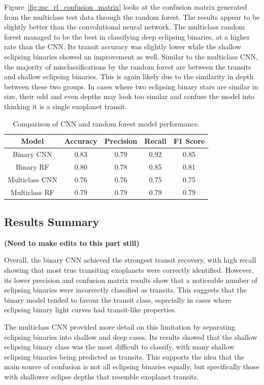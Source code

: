 Figure~\ref{fig:mc_rf_confusion_matrix} looks at the confusion matrix generated from the multiclass test data through the random forest. The results appear to be slightly better than the convolutional neural network. The multiclass random forest managed to be the best in classifying deep eclipsing binaries, at a higher rate than the CNN. Its transit accuracy was slightly lower while the shallow eclipsing binaries showed an improvement as well. Similar to the multiclass CNN, the majority of misclassifications by the random forest are between the transits and shallow eclipsing binaries. This is again likely due to the similarity in depth between these two groups. In cases where two eclipsing binary stars are similar in size, their odd and even depths may look too similar and confuse the model into thinking it is a single exoplanet transit.

\begin{table}[H]
    \centering
    \begin{tabular}{c|c|c|c|c}
        Model & Accuracy & Precision & Recall & F1 Score \\ \hline
        Binary CNN & 0.83 & 0.79 & 0.92 & 0.85 \\
        Binary RF & 0.80 & 0.78 & 0.85 & 0.81 \\
        Multiclass CNN & 0.76 & 0.76 & 0.75 & 0.75 \\
        Multiclass RF & 0.79 & 0.79 & 0.79 & 0.79
    \end{tabular}
    \caption{Comparison of CNN and random forest model performance.}
    \label{tab:model_comparison}
\end{table}

\subsection{Results Summary} \textbf{(Need to make edits to this part still)}

Overall, the binary CNN achieved the strongest transit recovery, with high recall showing that most true transiting exoplanets were correctly identified. However, its lower precision and confusion matrix results show that a noticeable number of eclipsing binaries were incorrectly classified as transits. This suggests that the binary model tended to favour the transit class, especially in cases where eclipsing binary light curves had transit-like properties.

The multiclass CNN provided more detail on this limitation by separating eclipsing binaries into shallow and deep cases. Its results showed that the shallow eclipsing binary class was the most difficult to classify, with many shallow eclipsing binaries being predicted as transits. This supports the idea that the main source of confusion is not all eclipsing binaries equally, but specifically those with shallower eclipse depths that resemble exoplanet transits.

